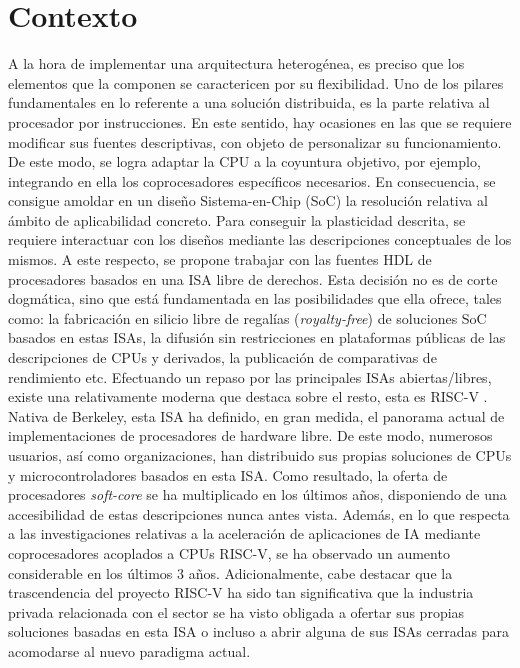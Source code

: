 \section{Contexto}

A la hora de implementar una arquitectura heterogénea, es preciso que los elementos que la componen se caractericen por su flexibilidad.
Uno de los pilares fundamentales en lo referente a una solución distribuida, es la parte relativa al procesador por instrucciones.
En este sentido, hay ocasiones en las que se requiere modificar sus fuentes descriptivas, con objeto de personalizar su funcionamiento.
De este modo, se logra adaptar la CPU a la coyuntura objetivo, por ejemplo, integrando en ella los coprocesadores específicos necesarios.
En consecuencia, se consigue amoldar en un diseño Sistema-en-Chip (SoC) la resolución relativa al ámbito de aplicabilidad concreto. 
Para conseguir la plasticidad descrita, se requiere interactuar con los diseños mediante las descripciones conceptuales de los mismos.
A este respecto, se propone trabajar con las fuentes HDL de procesadores basados en una ISA libre de derechos.
Esta decisión no es de corte dogmática, sino que está fundamentada en las posibilidades que ella ofrece, tales como: la fabricación en silicio libre de regalías (\textit{royalty-free}) de soluciones SoC basados en estas ISAs, la difusión sin restricciones en plataformas públicas de las descripciones de CPUs y derivados, la publicación de comparativas de rendimiento etc.
Efectuando un repaso por las principales ISAs abiertas/libres, existe una relativamente moderna que destaca sobre el resto, esta es RISC-V \cite{waterman13}.
Nativa de Berkeley, esta ISA ha definido, en gran medida, el panorama actual de implementaciones de procesadores de hardware libre. 
De este modo, numerosos usuarios, así como organizaciones, han distribuido sus propias soluciones de CPUs y microcontroladores basados en esta ISA.
Como resultado, la oferta de procesadores \textit{soft-core} se ha multiplicado en los últimos años, disponiendo de una accesibilidad de estas descripciones nunca antes vista.
Además, en lo que respecta a las investigaciones  relativas a la aceleración de aplicaciones de IA mediante coprocesadores acoplados a CPUs RISC-V, se ha observado un aumento considerable en los últimos 3 años.
Adicionalmente, cabe destacar que la trascendencia del proyecto RISC-V ha sido tan significativa que la industria privada relacionada con el sector se ha visto obligada a ofertar sus propias soluciones basadas en esta ISA o incluso a abrir alguna de sus ISAs cerradas para acomodarse al nuevo paradigma actual.

